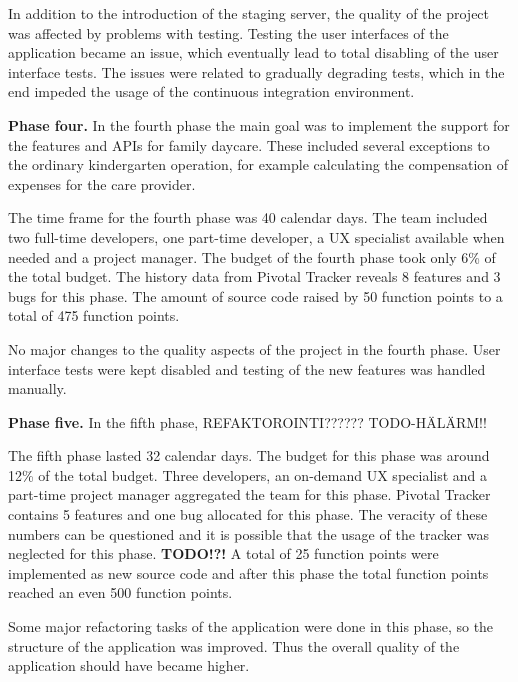 In addition to the introduction of the staging server, the quality of the project was affected by problems with testing. Testing the user interfaces of the application became an issue, which eventually lead to total disabling of the user interface tests. The issues were related to gradually degrading tests, which in the end impeded the usage of the continuous integration environment.

\textbf{Phase four.} In the fourth phase the main goal was to implement the support for the features and APIs for family daycare. These included several exceptions to the ordinary kindergarten operation, for example calculating the compensation of expenses for the care provider.

The time frame for the fourth phase was 40 calendar days. The team included two full-time developers, one part-time developer, a UX specialist available when needed and a project manager. The budget of the fourth phase took only 6\% of the total budget. The history data from Pivotal Tracker reveals 8 features and 3 bugs for this phase. The amount of source code raised by 50 function points to a total of 475 function points.

No major changes to the quality aspects of the project in the fourth phase. User interface tests were kept disabled and testing of the new features was handled manually.


\textbf{Phase five.} In the fifth phase, REFAKTOROINTI?????? TODO-HÄLÄRM!!


The fifth phase lasted 32 calendar days. The budget for this phase was around 12\% of the total budget. Three developers, an on-demand UX specialist and a part-time project manager aggregated the team for this phase. Pivotal Tracker contains 5 features and one bug allocated for this phase. The veracity of these numbers can be questioned and it is possible that the usage of the tracker was neglected for this phase. \textbf{TODO!?!} A total of 25 function points were implemented as new source code and after this phase the total function points reached an even 500 function points. 

Some major refactoring tasks of the application were done in this phase, so the structure of the application was improved. Thus the overall quality of the application should have became higher.

